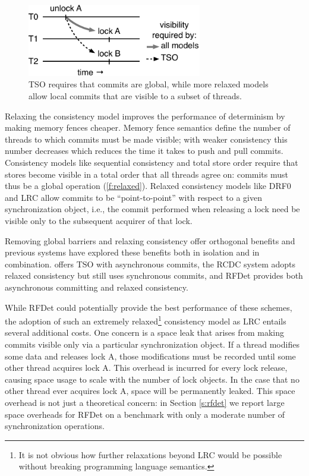\begin{figure}
\includegraphics[width=3.0in]{figures/relaxed-consistency.pdf}
\caption{TSO requires that commits are global, while more relaxed models allow local commits that are visible to a subset of threads.}
\label{f:relaxed}
\end{figure}

Relaxing the consistency model improves the performance of determinism by making memory fences cheaper. Memory fence semantics define the number of threads to which commits must be made visible; with weaker consistency this number decreases which reduces the time it takes to push and pull commits. Consistency models like sequential consistency and total store order require that stores become visible in a total order that all threads agree on: commits must thus be a global operation (\autoref{f:relaxed}). Relaxed consistency models like DRF0 \cite{devietti_rcdc:_2011} and LRC \cite{kai_lu_efficient_2014} allow commits to be ``point-to-point'' with respect to a given synchronization object, i.e., the commit performed when releasing a lock need be visible only to the subsequent acquirer of that lock.

Removing global barriers and relaxing consistency offer orthogonal benefits and previous systems have explored these benefits both in isolation and in combination. \cite{merrifield_conversion:_2013} offers TSO with asynchronous commits, the RCDC system \cite{devietti_rcdc:_2011} adopts relaxed consistency but still uses synchronous commits, and RFDet \cite{kai_lu_efficient_2014} provides both asynchronous committing and relaxed consistency.

While RFDet could potentially provide the best performance of these schemes, the adoption of such an extremely relaxed\footnote{It is not obvious how further relaxations beyond LRC would be possible without breaking programming language semantics.} consistency model as LRC entails several additional costs. One concern is a space leak that arises from making commits visible only via a particular synchronization object. If a thread modifies some data and releases lock A, those modifications must be recorded until some other thread acquires lock A. This overhead is incurred for every lock release, causing space usage to scale with the number of lock objects. In the case that no other thread ever acquires lock A, space will be permanently leaked. This space overhead is not just a theoretical concern: in Section \ref{s:rfdet} we report large space overheads for RFDet on a benchmark with only a moderate number of synchronization operations.


